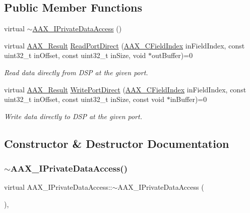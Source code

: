 \subsection*{Public Member Functions}
\begin{DoxyCompactItemize}
\item 
virtual \mbox{\hyperlink{a01865_ae4d930d2e8b4d46d7c49c9e40c4adf50}{$\sim$\+A\+A\+X\+\_\+\+I\+Private\+Data\+Access}} ()
\item 
virtual \mbox{\hyperlink{a00392_a4d8f69a697df7f70c3a8e9b8ee130d2f}{A\+A\+X\+\_\+\+Result}} \mbox{\hyperlink{a01865_a6e2816a489ff7f2bb1b8e5e5713db13d}{Read\+Port\+Direct}} (\mbox{\hyperlink{a00392_ae807f8986143820cfb5d6da32165c9c7}{A\+A\+X\+\_\+\+C\+Field\+Index}} in\+Field\+Index, const uint32\+\_\+t in\+Offset, const uint32\+\_\+t in\+Size, void $\ast$out\+Buffer)=0
\begin{DoxyCompactList}\small\item\em Read data directly from D\+SP at the given port. \end{DoxyCompactList}\item 
virtual \mbox{\hyperlink{a00392_a4d8f69a697df7f70c3a8e9b8ee130d2f}{A\+A\+X\+\_\+\+Result}} \mbox{\hyperlink{a01865_aac7df51eb48ebebed6979ea6678c9b35}{Write\+Port\+Direct}} (\mbox{\hyperlink{a00392_ae807f8986143820cfb5d6da32165c9c7}{A\+A\+X\+\_\+\+C\+Field\+Index}} in\+Field\+Index, const uint32\+\_\+t in\+Offset, const uint32\+\_\+t in\+Size, const void $\ast$in\+Buffer)=0
\begin{DoxyCompactList}\small\item\em Write data directly to D\+SP at the given port. \end{DoxyCompactList}\end{DoxyCompactItemize}


\subsection{Constructor \& Destructor Documentation}
\mbox{\label{a01865_ae4d930d2e8b4d46d7c49c9e40c4adf50}} 
\subsubsection{\texorpdfstring{$\sim$AAX\_IPrivateDataAccess()}{~AAX\_IPrivateDataAccess()}}
{\footnotesize\ttfamily virtual A\+A\+X\+\_\+\+I\+Private\+Data\+Access\+::$\sim$\+A\+A\+X\+\_\+\+I\+Private\+Data\+Access (\begin{DoxyParamCaption}{ }\end{DoxyParamCaption})\hspace{0.3cm}{\ttfamily [inline]}, {\ttfamily [virtual]}}



